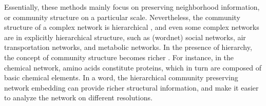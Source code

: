 \documentclass{article}
\theoremstyle{definition}
\newcommand{\origin}[1]{{\color{blue}{#1}}}
\begin{document}
		Essentially, these methods mainly focus on preserving neighborhood information, or community structure on a particular scale. 
		Nevertheless, the community structure of a complex network is hierarchical \cite{clauset2006structural}, and even some complex networks are in explicitly hierarchical structure, such as (wordnet) social networks, air transportation networks, and metabolic networks. 
		In the presence of hierarchy, the concept of community structure becomes richer \cite{sales-pardo2007extracting}. For instance, in the chemical network, amino acids constitute proteins, which in turn are composed of basic chemical elements. 
		In a word, the hierarchical community preserving network embedding can provide richer structural information, and make it easier to analyze the network on different resolutions.

		


		
\end{document}
